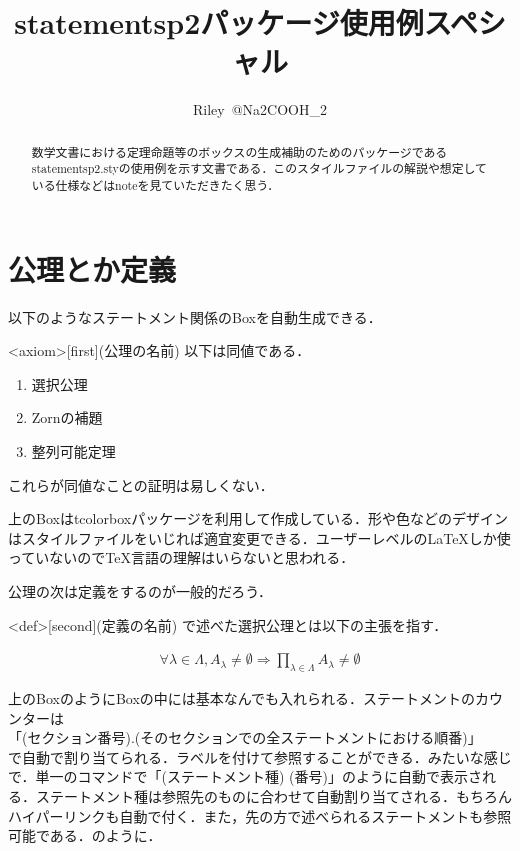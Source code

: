 \documentclass[11pt, a4paper]{ltjsarticle}
\title{statementsp2パッケージ使用例スペシャル}
\author{Riley~@Na2COOH\_2}
\begin{document}
\maketitle
\begin{abstract}
    数学文書における定理命題等のボックスの生成補助のためのパッケージであるstatementsp2.styの使用例を示す文書である．このスタイルファイルの解説や想定している仕様などはnoteを見ていただきたく思う．
\end{abstract}

\tableofcontents
\thispagestyle{fancy} %
\newpage 

\section{公理とか定義}
以下のようなステートメント関係のBoxを自動生成できる．
\begin{statementsp}<axiom>[first](公理の名前)
    以下は同値である．
    \begin{enumerate}[(1)]
        \item 選択公理
        \item Zornの補題
        \item 整列可能定理
    \end{enumerate}
    これらが同値なことの証明は易しくない．
\end{statementsp}
上のBoxはtcolorboxパッケージを利用して作成している．形や色などのデザインはスタイルファイルをいじれば適宜変更できる．ユーザーレベルのLaTeXしか使っていないのでTeX言語の理解はいらないと思われる．

公理の次は定義をするのが一般的だろう．

\begin{statementsp}<def>[second](定義の名前)
    で述べた選択公理とは以下の主張を指す．
    \begin{tcolorbox}
        \begin{align}
            \forall \lambda \in \Lambda, A_{\lambda} \neq \emptyset \Longrightarrow \prod_{\lambda \in \Lambda}A_{\lambda} \neq \emptyset
        \end{align}
    \end{tcolorbox}
\end{statementsp}

上のBoxのようにBoxの中には基本なんでも入れられる．ステートメントのカウンターは\\ 
「(セクション番号).(そのセクションでの全ステートメントにおける順番)」\\ 
で自動で割り当てられる．ラベルを付けて参照することができる．みたいな感じで．単一のコマンドで「(ステートメント種) (番号)」のように自動で表示される．ステートメント種は参照先のものに合わせて自動割り当てされる．もちろんハイパーリンクも自動で付く．また，先の方で述べられるステートメントも参照可能である．のように．
\end{document}
